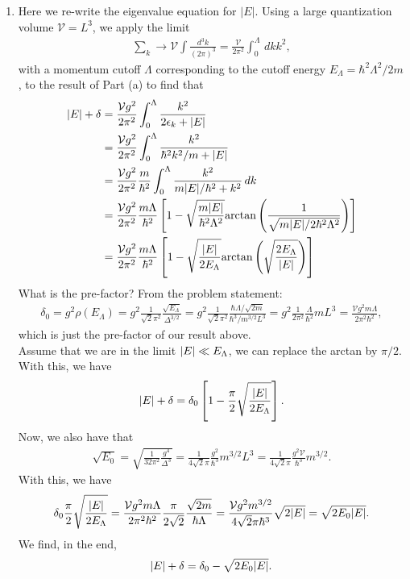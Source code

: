 \documentclass{article}
\theoremstyle{definition}
\newcommand{\f}[2]{\frac{#1}{#2}}
\newcommand{\lp}{\left(}
\newcommand{\rp}{\right)}
\newcommand{\lb}{\left[}
\newcommand{\rb}{\right]}
\begin{document}
\begin{enumerate}[label=(\alph*)]
\item Here we re-write the eigenvalue equation for $|E|$. Using a large quantization volume $\mathcal{V} = L^3$, we apply the limit
\begin{align*}
\sum_k \to \mathcal{V} \int \f{d^3 k }{ (2\pi)^3} = \f{\mathcal{V}}{2\pi^2} \int_0^\Lambda \,dk k^2,
\end{align*}
with a momentum cutoff $\Lambda$ corresponding to the cutoff energy $E_\Lambda  = \hbar^2 \Lambda^2 / 2m$, to the result of Part (a) to find that
\begin{align*}
\abs{E} + \delta 
&=  \f{\mathcal{V} g^2 }{2\pi^2} \int_0^\Lambda \f{k^2}{2\epsilon_k + \abs{E}}  \\
&=  \f{\mathcal{V} g^2 }{2\pi^2} \int_0^\Lambda \f{k^2}{\hbar^2 k^2/m + \abs{E}}  \\
&=  \f{\mathcal{V} g^2 }{2\pi^2} \f{m}{\hbar^2} \int_0^\Lambda  \f{k^2}{m \abs{E} / \hbar^2 + k^2}  \,dk  \\
&=  \f{\mathcal{V} g^2 }{2\pi^2} \f{m\Lambda}{\hbar^2} \lb 1 - \sqrt{\f{m\abs{E}}{\hbar^2\Lambda^2}} \text{arctan}\lp \f{1}{\sqrt{m\abs{E} / 2\hbar^2\Lambda^2}}  \rp \rb \\ 
&= \f{\mathcal{V} g^2 }{2\pi^2} \f{m\Lambda}{\hbar^2} \lb 1 -  \sqrt{\f{\abs{E}}{2E_\Lambda}} \text{arctan}\lp 
\sqrt{\f{2E_\Lambda}{\abs{E}}}
\rp \rb \\ 
\end{align*}
What is the pre-factor? From the problem statement:
\begin{align*}
\delta_0 = g^2 \rho(E_\Lambda) = g^2 \f{1}{\sqrt{2} \pi^2} \f{\sqrt{E_\Lambda}}{ \Delta^{3/2}}  = g^2 \f{1}{\sqrt{2} \pi^2} \f{  \hbar \Lambda / \sqrt{2m}  }{  \hbar^3 / m^{3/2} L^3   }  = g^2 \f{1}{2 \pi^2} \f{\Lambda}{\hbar^2} mL^3 = \f{\mathcal{V} g^2 m\Lambda }{2\pi^2 \hbar^2 },
\end{align*}
which is just the pre-factor of our result above. \\

Assume that we are in the limit $\abs{E} \ll E_\Lambda$, we can replace the arctan by $\pi/2$. With this, we have
\begin{align*}
\abs{E} + \delta = \delta_0 \lb 1 - \f{\pi}{2} \sqrt{\f{\abs{E}}{2E_\Lambda}}   \rb.
\end{align*}
Now, we also have that
\begin{align*}
\sqrt{E_0} = \sqrt{\f{1}{32\pi^2} \f{g^4}{\Delta^3}} = \f{1}{4\sqrt{2} \pi} \f{g^2}{\hbar^3} m^{3/2} L^3 = 
\f{1}{4\sqrt{2} \pi} \f{g^2  \mathcal{V}}{\hbar^3} m^{3/2}.
\end{align*}
With this, we have
\begin{align*}
\delta_0 \f{\pi}{2} \sqrt{ \f{\abs{E}}{2E_\Lambda}  } = \f{\mathcal{V} g^2 m\Lambda }{2\pi^2 \hbar^2 } \f{\pi}{2\sqrt{2}}  \f{ \sqrt{2 m} }{\hbar \Lambda} = 
\f{\mathcal{V} g^2 m^{3/2} }{4\sqrt{2} \pi \hbar^3 }
\sqrt{2 \abs{E}}
= \sqrt{2 E_0 \abs{E}}.
\end{align*}
We find, in the end,
\begin{align*}
{\abs{E} + \delta = \delta_0 - \sqrt{2 E_0 \abs{E}}}.
\end{align*}



\end{enumerate}
\end{document}
